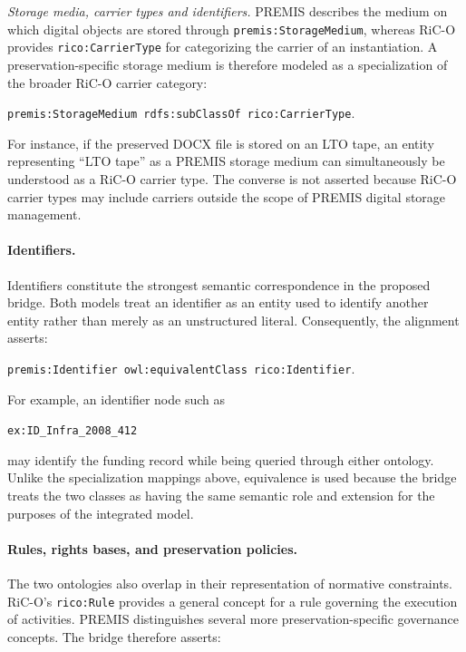 \documentclass[runningheads]{llncs}
\begin{document}
\emph{Storage media, carrier types and identifiers.}
PREMIS describes the medium on which digital objects are stored through
\texttt{premis:StorageMedium}, whereas RiC-O provides
\texttt{rico:CarrierType} for categorizing the carrier of an instantiation.
A preservation-specific storage medium is therefore modeled as a
specialization of the broader RiC-O carrier category:

\begin{center}
	\texttt{premis:StorageMedium rdfs:subClassOf rico:CarrierType}.
\end{center}

For instance, if the preserved DOCX file is stored on an LTO tape, an entity
representing ``LTO tape'' as a PREMIS storage medium can simultaneously be
understood as a RiC-O carrier type. The converse is not asserted because
RiC-O carrier types may include carriers outside the scope of PREMIS digital
storage management.

\paragraph{Identifiers.}
Identifiers constitute the strongest semantic correspondence in the
proposed bridge. Both models treat an identifier as an entity used to
identify another entity rather than merely as an unstructured literal.
Consequently, the alignment asserts:

\begin{center}
	\texttt{premis:Identifier owl:equivalentClass rico:Identifier}.
\end{center}

For example, an identifier node such as

\begin{center}
	\texttt{ex:ID\_Infra\_2008\_412}
\end{center}

may identify the funding record while being queried through either ontology.
Unlike the specialization mappings above, equivalence is used because the
bridge treats the two classes as having the same semantic role and extension
for the purposes of the integrated model.



\paragraph{Rules, rights bases, and preservation policies.}
The two ontologies also overlap in their representation of normative
constraints. RiC-O's \texttt{rico:Rule} provides a general concept for a
rule governing the execution of activities. PREMIS distinguishes several
more preservation-specific governance concepts. The bridge therefore
asserts:
\end{document}
